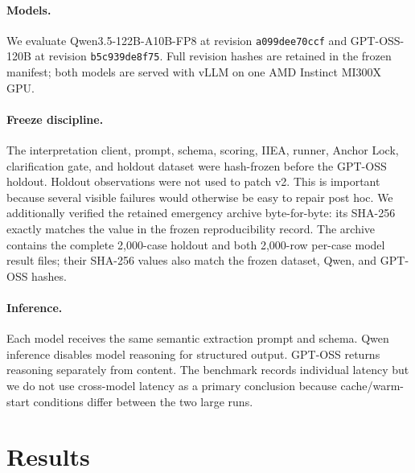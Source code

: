 \paragraph{Models.}
We evaluate Qwen3.5-122B-A10B-FP8 \cite{qwen35} at revision \texttt{a099dee70ccf} and GPT-OSS-120B \cite{gptoss120b} at revision \texttt{b5c939de8f75}. Full revision hashes are retained in the frozen manifest; both models are served with vLLM on one AMD Instinct MI300X GPU.

\paragraph{Freeze discipline.}
The interpretation client, prompt, schema, scoring, IIEA, runner, Anchor Lock, clarification gate, and holdout dataset were hash-frozen before the GPT-OSS holdout. Holdout observations were not used to patch v2. This is important because several visible failures would otherwise be easy to repair post hoc. We additionally verified the retained emergency archive byte-for-byte: its SHA-256 exactly matches the value in the frozen reproducibility record. The archive contains the complete 2,000-case holdout and both 2,000-row per-case model result files; their SHA-256 values also match the frozen dataset, Qwen, and GPT-OSS hashes.

\paragraph{Inference.}
Each model receives the same semantic extraction prompt and schema. Qwen inference disables model reasoning for structured output. GPT-OSS returns reasoning separately from content. The benchmark records individual latency but we do not use cross-model latency as a primary conclusion because cache/warm-start conditions differ between the two large runs.

\section{Results}


